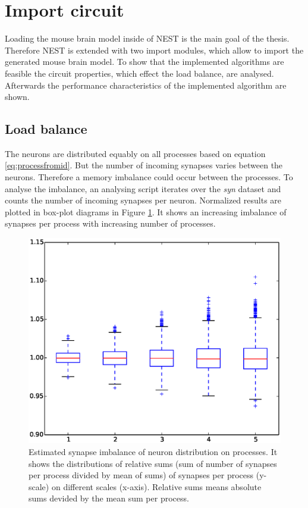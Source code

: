 \section{Import circuit}
Loading the mouse brain model inside of NEST is the main goal of the thesis.
Therefore NEST is extended with two import modules, which allow to import the
generated mouse brain model. To show that the implemented algorithms are feasible 
the circuit properties, which effect the load balance, are analysed.
Afterwards the performance characteristics of the implemented algorithm are shown.

\subsection{Load balance}
The neurons are distributed equably on all processes based on equation \ref{eq:processfromid}.
But the number of incoming synapses varies between the neurons.
Therefore a memory imbalance could occur between the processes.
To analyse the imbalance, an analysing script iterates over the \emph{syn} dataset and counts
the number of incoming synapses per neuron. Normalized results are plotted in box-plot diagrams 
in Figure \ref{fullcircuitdist}.
It shows an increasing imbalance of synapses per process with increasing number of processes.
\begin{figure}[ht!]
\centering
\includegraphics[scale=0.4]{pictures/full_circuit_rack_distribution.eps}
\caption{Estimated synapse imbalance of neuron distribution on processes.
It shows the distributions of relative sums (sum of number of synapses per process divided by mean of sums) of synapses per process (y-scale) on different scales (x-axis). Relative sums means absolute sums devided by the mean sum per process. }
\label{fullcircuitdist}
\end{figure}

